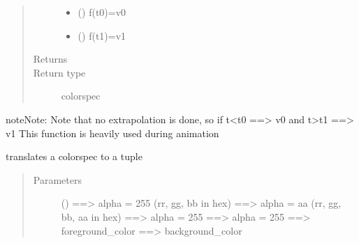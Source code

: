 \documentclass[letterpaper,10pt,english]{sphinxmanual}
\begin{document}
\begin{fulllineitems}
\begin{fulllineitems}
\begin{quote}
\begin{description}
\begin{itemize}
\item {} 
 () \textendash{} f(t0)=v0

\item {} 
 () \textendash{} f(t1)=v1

\end{itemize}

\item[{Returns}] \leavevmode
{}

\item[{Return type}] \leavevmode
colorspec

\end{description}\end{quote}

\begin{sphinxadmonition}{note}{Note:}
Note that no extrapolation is done, so if t\textless{}t0 ==\textgreater{} v0  and t\textgreater{}t1 ==\textgreater{} v1 
This function is heavily used during animation
\end{sphinxadmonition}

\end{fulllineitems}


\begin{fulllineitems}
\label{\detokenize{Reference:salabim.Environment.colorspec_to_tuple}}
translates a colorspec to a tuple
\begin{quote}\begin{description}
\item[{Parameters}] \leavevmode
{} (\sphinxstyleliteralemphasis{, }) \textendash{}  ==\textgreater{} alpha = 255 (rr, gg, bb in hex) 
 ==\textgreater{} alpha = aa (rr, gg, bb, aa in hex) 
 ==\textgreater{} alpha = 255 
 ==\textgreater{} alpha = 255 
 ==\textgreater{} foreground\_color 
 ==\textgreater{} background\_color


\end{description}
\end{quote}
\end{fulllineitems}
\end{fulllineitems}
\end{document}
